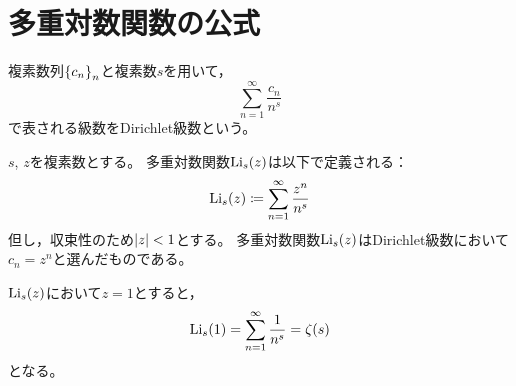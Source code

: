 \documentclass[a4paper,draft]{ltjsarticle}
\begin{document}
\section{多重対数関数の公式}\label{sec:Polylog}
\begin{defi}[Dirichlet級数]
    複素数列$\seq{c_n}{n}$と複素数$s$を用いて，
    \begin{equation}
        \sum_{n=1}^\infty \frac{c_n}{n^s}
    \end{equation}
    で表される級数をDirichlet級数という。
\end{defi}

\begin{defi}[多重対数関数]
    $s$, $z$を複素数とする。
    多重対数関数$\Li{s}{z}$は以下で定義される：
    \begin{equation}
        \Li{s}{z} \coloneqq \sum_{n=1}^\infty \frac{z^n}{n^s}
    \end{equation}
    但し，収束性のため$\abs{z}<1$とする。
    多重対数関数$\Li{s}{z}$はDirichlet級数において$c_n = z^n$と選んだものである。
\end{defi}

\begin{eg}
    $\Li{s}{z}$において$z=1$とすると，
    \begin{equation}
        \Li{s}{1}=\sum_{n=1}^\infty \frac{1}{n^s}=\fun{\zeta}{s}
    \end{equation}
    となる。
\end{eg}
\end{document}
